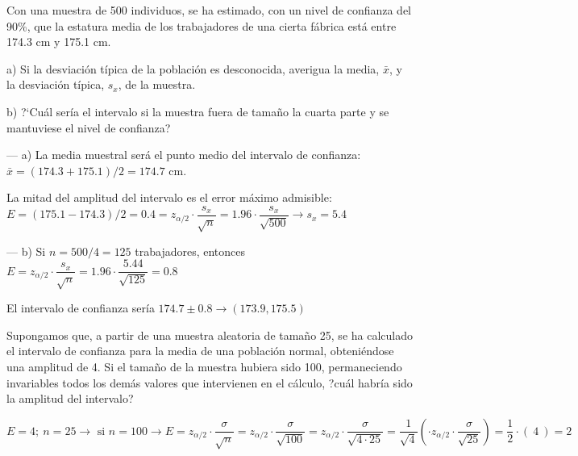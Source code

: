\vspace{5mm} %
\begin{ejemplo}
\begin{ejer}
	Con una muestra de 500 individuos, se ha estimado, con un nivel de confianza del 90\%, que la estatura media de los trabajadores de una cierta fábrica está entre 174.3 cm y 175.1 cm.
	
\vspace{2mm} a) Si la desviación típica de la población es desconocida, averigua la media, $\bar x$, y la desviación típica, $s_x$, de la muestra.

\vspace{2mm} b) ?`Cuál sería el intervalo si la muestra fuera de tamaño la cuarta parte y se mantuviese el nivel de confianza?
\end{ejer}
	
\end{ejemplo}

\vspace{2mm} --- a) La media muestral será el punto medio del intervalo de confianza: $\bar x=(174.3+175.1)/2=174.7$ cm.

\vspace{2mm} La mitad del amplitud del intervalo es el error máximo admisible: $E=(175.1-174.3)/2=0.4=z_{\alpha/2}\cdot \dfrac{s_x}{\sqrt{n}}=1.96\cdot \dfrac{s_x}{\sqrt{500}} \to s_x=5.4$

\vspace{2mm} --- b) Si $n=500/4=125$ trabajadores, entonces $E=z_{\alpha/2}\cdot \dfrac{s_x}{\sqrt{n}}=1.96\cdot \dfrac{5.44}{\sqrt{125}}=0.8$

\vspace{2mm} El intervalo de confianza sería $174.7\pm 0.8 \to (173.9,175.5)$


\vspace{5mm} %
\begin{ejemplo}
\begin{ejer}
	Supongamos que, a partir de una muestra aleatoria de tamaño 25, se ha calculado el intervalo de confianza para la media de una población normal, obteniéndose una amplitud de 4. Si el tamaño de la muestra hubiera sido 100, permaneciendo invariables todos los demás valores que intervienen en el cálculo, ?cuál habría sido la amplitud del intervalo?
\end{ejer}
	
\end{ejemplo}

\vspace{2mm} $E=4;\ n=25 \to \text{ si } n=100 \to E=z_{\alpha/2}\cdot \dfrac{\sigma}{\sqrt{n}}=z_{\alpha/2}\cdot \dfrac{\sigma}{\sqrt{100}}=z_{\alpha/2}\cdot \dfrac{\sigma}{\sqrt{4 \cdot 25}}=\dfrac {1} {\sqrt{4}} \left( \cdot z_{\alpha/2} \cdot  \dfrac{\sigma}{\sqrt{25}} \right) = \dfrac 1 2 \cdot (\ 4\ ) =2$

